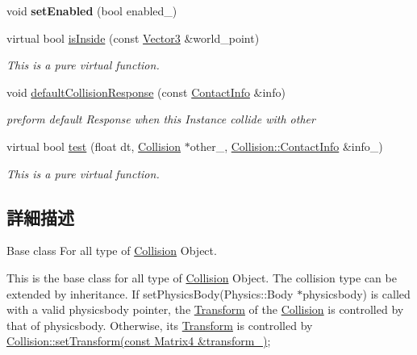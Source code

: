 \begin{DoxyCompactItemize}
\item 
void {\bfseries set\+Enabled} (bool enabled\+\_\+)\hypertarget{class_magnum_1_1_collision_a4cf7e1b0fc9cebfbf145265f0f21dfdc}{}\label{class_magnum_1_1_collision_a4cf7e1b0fc9cebfbf145265f0f21dfdc}

\item 
virtual bool \hyperlink{class_magnum_1_1_collision_a129bf6c62902ea60649bb4dfdc51064b}{is\+Inside} (const \hyperlink{class_magnum_1_1_vector3}{Vector3} \&world\+\_\+point)
\begin{DoxyCompactList}\small\item\em This is a pure virtual function. \end{DoxyCompactList}\item 
void \hyperlink{class_magnum_1_1_collision_a3add6ba3c46ce3a728b3f27ddefd81d2}{default\+Collision\+Response} (const \hyperlink{class_magnum_1_1_collision_1_1_contact_info}{Contact\+Info} \&info)
\begin{DoxyCompactList}\small\item\em preform default Response when this Instance collide with other \end{DoxyCompactList}\item 
virtual bool \hyperlink{class_magnum_1_1_collision_aaea103ce5b2bc5930ab754e4d2b6247b}{test} (float dt, \hyperlink{class_magnum_1_1_collision}{Collision} $\ast$other\+\_\+, \hyperlink{class_magnum_1_1_collision_1_1_contact_info}{Collision\+::\+Contact\+Info} \&info\+\_\+)
\begin{DoxyCompactList}\small\item\em This is a pure virtual function. \end{DoxyCompactList}\end{DoxyCompactItemize}


\subsection{詳細描述}
Base class For all type of \hyperlink{class_magnum_1_1_collision}{Collision} Object. 

This is the base class for all type of \hyperlink{class_magnum_1_1_collision}{Collision} Object. The collision type can be extended by inheritance. If set\+Physics\+Body(\+Physics\+::\+Body $\ast$physicsbody) is called with a valid physicsbody pointer, the \hyperlink{class_magnum_1_1_transform}{Transform} of the \hyperlink{class_magnum_1_1_collision}{Collision} is controlled by that of physicsbody. Otherwise, its \hyperlink{class_magnum_1_1_transform}{Transform} is controlled by \hyperlink{class_magnum_1_1_collision_ac7719f4d3e922b0234889d58987d5542}{Collision\+::set\+Transform(const Matrix4 \&transform\+\_\+)}; 

